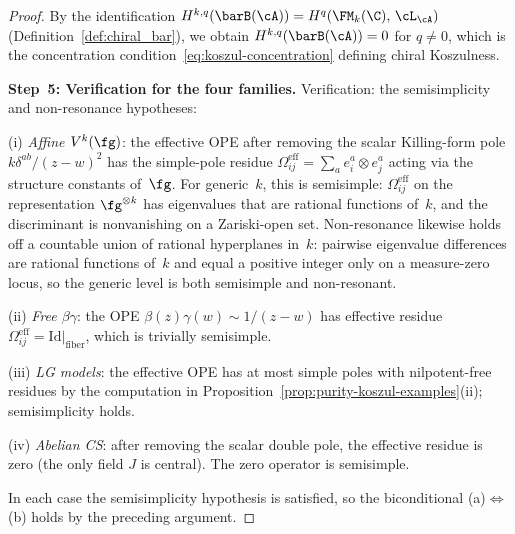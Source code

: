 \begin{proof}
By the identification $H^{k,q}(\barB(\cA)) =
H^q(\FM_k(\C),\,\cL_\cA)$
(Definition~\ref{def:chiral_bar}), we obtain
$H^{k,q}(\barB(\cA)) = 0$ for $q \neq 0$, which is the
concentration condition~\eqref{eq:koszul-concentration}
defining chiral Koszulness.

\medskip\noindent\textbf{Step~5: Verification for the four families.}
Verification: the semisimplicity and non-resonance hypotheses:

(i) \emph{Affine $V^k(\fg)$}: the effective OPE after removing the
scalar Killing-form pole $k\delta^{ab}/(z-w)^2$ has the
simple-pole residue $\Omega_{ij}^{\mathrm{eff}} = \sum_a
e_i^a \otimes e_j^a$ acting via the structure constants of~$\fg$.
For generic~$k$, this is semisimple:
$\Omega_{ij}^{\mathrm{eff}}$ on the representation
$\fg^{\otimes k}$ has eigenvalues that are rational
functions of~$k$, and the discriminant is nonvanishing on
a Zariski-open set. Non-resonance likewise holds off a
countable union of rational hyperplanes in~$k$: pairwise
eigenvalue differences are rational functions of~$k$ and equal a
positive integer only on a measure-zero locus, so the generic level
is both semisimple and non-resonant.

(ii) \emph{Free $\beta\gamma$}: the OPE
$\beta(z)\gamma(w) \sim 1/(z-w)$ has effective
residue $\Omega_{ij}^{\mathrm{eff}} = \mathrm{Id}|_{\text{fiber}}$,
which is trivially semisimple.

(iii) \emph{LG models}: the effective OPE has at most simple poles
with nilpotent-free residues by the computation in
Proposition~\ref{prop:purity-koszul-examples}(ii);
semisimplicity holds.

(iv) \emph{Abelian CS}: after removing the scalar double pole,
the effective residue is zero (the only field $J$ is central).
The zero operator is semisimple.

In each case the semisimplicity hypothesis is satisfied, so
the biconditional (a)$\Leftrightarrow$(b) holds by the
preceding argument.
\end{proof}

